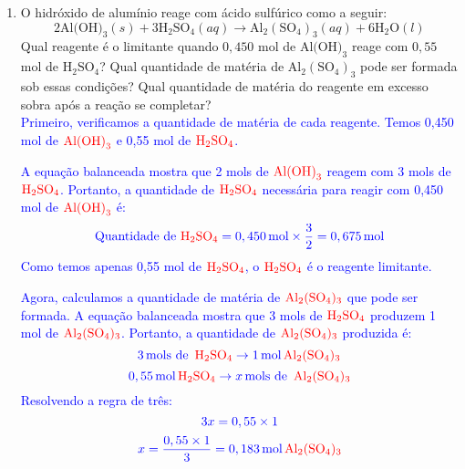 \documentclass[a4paper, 12pt]{article}
\begin{document}
\begin{enumerate}
    \item O hidróxido de alumínio reage com ácido sulfúrico como a seguir:
          \[
              2\text{Al(OH)}_{3}(s) + 3\text{H}_{2}\text{SO}_{4}(aq) \rightarrow \text{Al}
              _{2}(\text{SO}_{4})_{3}(aq) + 6\text{H}_{2}\text{O}(l)
          \]
          Qual reagente é o limitante quando $0,450$ mol de $\text{Al(OH)}_{3}$
          reage com $0,55$ mol de $\text{H}_{2}\text{SO}_{4}$? Qual quantidade de matéria
          de $\text{Al}_{2}(\text{SO}_{4})_{3}$ pode ser formada sob essas condições?
          Qual quantidade de matéria do reagente em excesso sobra após a reação se
          completar?
          \\[20pt]
          \textcolor{blue}{Primeiro, verificamos a quantidade de matéria de cada reagente. Temos 0,450 mol de \(\textcolor{red}{\text{Al(OH)}_{3}}\) e 0,55 mol de \(\textcolor{red}{\text{H}_{2}\text{SO}_{4}}\).}

          \textcolor{blue}{A equação balanceada mostra que 2 mols de \(\textcolor{red}{\text{Al(OH)}_{3}}\) reagem com 3 mols de \(\textcolor{red}{\text{H}_{2}\text{SO}_{4}}\). Portanto, a quantidade de \(\textcolor{red}{\text{H}_{2}\text{SO}_{4}}\) necessária para reagir com 0,450 mol de \(\textcolor{red}{\text{Al(OH)}_{3}}\) é:}
          \[
              \textcolor{blue}{\text{Quantidade de } \textcolor{red}{\text{H}_{2}\text{SO}_{4}} = 0,450 \, \text{mol} \times \frac{3}{2} = 0,675 \, \text{mol}}
          \]
          \textcolor{blue}{Como temos apenas 0,55 mol de \(\textcolor{red}{\text{H}_{2}\text{SO}_{4}}\), o \(\textcolor{red}{\text{H}_{2}\text{SO}_{4}}\) é o reagente limitante.}

          \textcolor{blue}{Agora, calculamos a quantidade de matéria de \(\textcolor{red}{\text{Al}_{2}(\text{SO}_{4})_{3}}\) que pode ser formada. A equação balanceada mostra que 3 mols de \(\textcolor{red}{\text{H}_{2}\text{SO}_{4}}\) produzem 1 mol de \(\textcolor{red}{\text{Al}_{2}(\text{SO}_{4})_{3}}\). Portanto, a quantidade de \(\textcolor{red}{\text{Al}_{2}(\text{SO}_{4})_{3}}\) produzida é:}
          \[
              \textcolor{blue}{3 \, \text{mols de } \, \textcolor{red}{\text{H}_{2}\text{SO}_{4}} \rightarrow 1 \, \text{mol} \, \textcolor{red}{\text{Al}_{2}(\text{SO}_{4})_{3}}}
          \]
          \[
              \textcolor{blue}{0,55 \, \text{mol} \, \textcolor{red}{\text{H}_{2}\text{SO}_{4}} \rightarrow x \, \text{mols de } \, \textcolor{red}{\text{Al}_{2}(\text{SO}_{4})_{3}}}
          \]
          \textcolor{blue}{Resolvendo a regra de três:}
          \[
              \textcolor{blue}{3x = 0,55 \times 1}
          \]
          \[
              \textcolor{blue}{x = \frac{0,55 \times 1}{3} = 0,183 \, \text{mol} \, \textcolor{red}{\text{Al}_{2}(\text{SO}_{4})_{3}}}
          \]


\end{enumerate}
\end{document}
